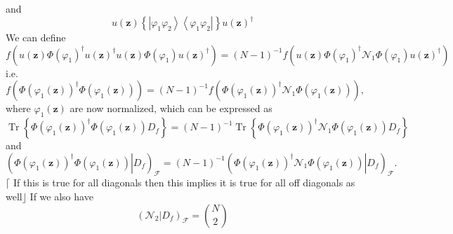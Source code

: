\documentclass[aps,preprint]{revtex4}%
\begin{document}
and
\begin{equation}
u\left(  \mathbf{z}\right)  \left\{  \left\vert \varphi_{1}\varphi
_{2}\right\rangle \left\langle \varphi_{1}\varphi_{2}\right\vert \right\}
u\left(  \mathbf{z}\right)  ^{\dagger}%
\end{equation}
We can define
\begin{equation}
f\left(  u\left(  \mathbf{z}\right)  \Phi\left(  \varphi_{1}\right)
^{\dagger}u\left(  \mathbf{z}\right)  ^{\dagger}u\left(  \mathbf{z}\right)
\Phi\left(  \varphi_{1}\right)  u\left(  \mathbf{z}\right)  ^{\dagger}\right)
=\left(  N-1\right)  ^{-1}f\left(  u\left(  \mathbf{z}\right)  \Phi\left(
\varphi_{1}\right)  ^{\dagger}\mathcal{N}_{1}\Phi\left(  \varphi_{1}\right)
u\left(  \mathbf{z}\right)  ^{\dagger}\right)
\end{equation}
i.e.%
\begin{equation}
f\left(  \Phi\left(  \varphi_{1}\left(  \mathbf{z}\right)  \right)  ^{\dagger
}\Phi\left(  \varphi_{1}\left(  \mathbf{z}\right)  \right)  \right)  =\left(
N-1\right)  ^{-1}f\left(  \Phi\left(  \varphi_{1}\left(  \mathbf{z}\right)
\right)  ^{\dagger}\mathcal{N}_{1}\Phi\left(  \varphi_{1}\left(
\mathbf{z}\right)  \right)  \right)  ,
\end{equation}
where $\varphi_{1}\left(  \mathbf{z}\right)  $ are now normalized, which can
be expressed as%
\begin{equation}
\operatorname*{Tr}\left\{  \Phi\left(  \varphi_{1}\left(  \mathbf{z}\right)
\right)  ^{\dagger}\Phi\left(  \varphi_{1}\left(  \mathbf{z}\right)  \right)
D_{f}\right\}  =\left(  N-1\right)  ^{-1}\operatorname*{Tr}\left\{
\Phi\left(  \varphi_{1}\left(  \mathbf{z}\right)  \right)  ^{\dagger
}\mathcal{N}_{1}\Phi\left(  \varphi_{1}\left(  \mathbf{z}\right)  \right)
D_{f}\right\}
\end{equation}
and
\begin{equation}
\left(  \left.  \Phi\left(  \varphi_{1}\left(  \mathbf{z}\right)  \right)
^{\dagger}\Phi\left(  \varphi_{1}\left(  \mathbf{z}\right)  \right)
\right\vert D_{f}\right)  _{\mathcal{F}}=\left(  N-1\right)  ^{-1}\left(
\left.  \Phi\left(  \varphi_{1}\left(  \mathbf{z}\right)  \right)  ^{\dagger
}\mathcal{N}_{1}\Phi\left(  \varphi_{1}\left(  \mathbf{z}\right)  \right)
\right\vert D_{f}\right)  _{\mathcal{F}}.
\end{equation}
$\lceil$ If this is true for all diagonals then this implies it is true for
all off diagonals as well$\rfloor$ If we also have%
\begin{equation}
\left(  \left.  \mathcal{N}_{2}\right\vert D_{f}\right)  _{\mathcal{F}}%
=\binom{N}{2}%
\end{equation}
\end{document}
